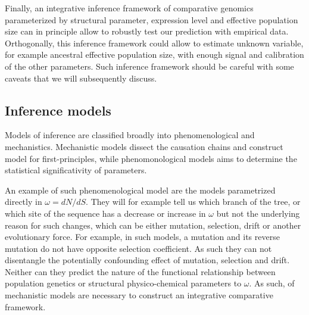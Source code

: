\documentclass{article}
\begin{document}
	Finally, an integrative inference framework of comparative genomics parameterized by structural parameter, expression level and effective population size can in principle allow to robustly test our prediction with empirical data. 
	Orthogonally, this inference framework could allow to estimate unknown variable, for example ancestral effective population size, with enough signal and calibration of the other parameters. 
	Such inference framework should be careful with some caveats that we will subsequently discuss.
	\subsection*{Inference models}
	Models of inference are classified broadly into phenomenological and mechanistics.
	Mechanistic models dissect the causation chains and construct model for first-principles, while phenomonological models aims to determine the statistical significativity of parameters.
	
	An example of such phenomenological model are the models parametrized directly in $\omega = dN/dS$.
	They will for example tell us which branch of the tree, or which site of the sequence has a decrease or increase in $\omega$ but not the underlying reason for such changes, which can be either mutation, selection, drift or another evolutionary force.
	For example, in such models, a mutation and its reverse mutation do not have opposite selection coefficient.
	As such they can not disentangle the potentially confounding effect of mutation, selection and drift.
	Neither can they predict the nature of the functional relationship between population genetics or structural physico-chemical parameters to $\omega$.
	As such, of mechanistic models are necessary to construct an integrative comparative framework.
	
\end{document}
